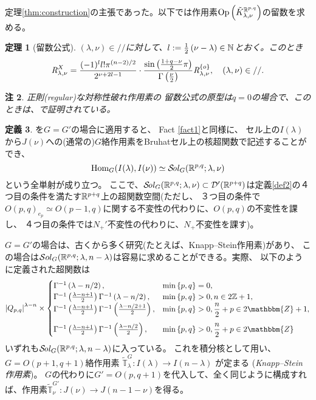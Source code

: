 \documentclass[12pt]{article} %
\newcommand{\Hom}{\mbox{\normalfont Hom}}
\newcommand{\Sol}{\mathcal{S}\!{\it ol}}
\newtheorem{theorem}{定理}
\newtheorem{remark}[theorem]{注}
\theoremstyle{definition}
\newtheorem{definition}[theorem]{定義}
\theoremstyle{exampstyle} \newtheorem{examp}[theorem]{Theorem}
\newcommand{\Op}{\mbox{\normalfont Op}}
\newcommand{\OpR}{\mbox{\it R}}
\renewcommand{\Q}{Q_{p,q}}
\newcommand{\doubt}[1]{{#1}}
\begin{document}
定理\ref{thm:construction}の主張であった。以下では作用素$\Op\left( \tilde{K}^{\R^{p,q}}_{\lambda,\nu} \right)$の留数を求める。
\begin{theorem}[留数公式]
	$(\lambda,\nu)\in//$に対して、$l:=\frac{1}{2}\left( \nu-\lambda \right)\in\mathbb{N}$とおく。このとき
  \[\OpR_{\lambda,\nu}^X  = \frac{ (- 1)^l l!\pi^{(n - 2) / 2} 
		}{2^{ \nu + 2 l-1}}\cdot  \frac{\sin\left( \frac{1+q-\nu}{2}\pi \right)}{\Gamma\left( \frac{\nu}{2} \right)}
     \OpR_{\lambda,\nu}^{ \left\{ o \right\} },\quad(\lambda,\nu)\in// . \]
	\end{theorem}
	\begin{remark}
		正則(regular)な対称性破れ作用素の
		留数公式の原型は$q=0$の場合で、このときは\cite{KOBAYASHI2014272}、\cite[Thm. 12.2]{kobayashi2015symmetry}で証明されている。
	\end{remark}
	\begin{definition}
		\cite[Thm. 3.16]{kobayashi2015symmetry}を$G=G'$の場合に適用すると\doubt{、}
		Fact \ref{fact1}と同様に、
		セル上の$I(\lambda)$から$J(\nu)$への(通常の)$G$絡作用素をBruhatセル上の核超関数で記述することができ、
		\begin{equation*}
		\Hom_G(I(\lambda),I(\nu))\simeq\Sol_G(\R^{p,q};\lambda,\nu)
		\end{equation*}
		という全単射が成り立つ。
		ここで、\;$\Sol_G(\R^{p,q};\lambda,\nu)\subset\mathcal{D}'(\R^{p+q})$は定義\ref{def2}の４つ目の条件を満たす$\mathbb{R}^{p+q}$上の超関数空間(ただし、
		３つ目の条件で$O(p,q)_{e_p}\simeq O(p-1,q)${に関する}不変性の代わりに、$O(p,q)$の不変性を課し、
		４つ目の条件では$N_+'$不変性の代わりに、$N_+$不変性を課す)。

		$G=G'$の場合は、古くから多く研究(たとえば、Knapp--Stein作用素)があり、
		この場合は$\mathcal{S}ol_G(\mathbb{R}^{p,q};\lambda,n-\lambda)$は容易に求めることができる。実際、
		以下のように定義された超関数は
		\begin{equation*}
			\myabs{\Q}^{\lambda-n}\times\begin{cases}
				\Gamma^{-1}\left( \lambda-n/2 \right),&\min\left\{ p,q \right\}=0,\\
				\Gamma^{-1}\left( \frac{\lambda-n+1}{2} \right)\Gamma^{-1}\left( \lambda-n/2 \right),&\min\left\{ p,q \right\}>0,n\in2\Z+1,\\
  \Gamma^{-1} \left( \frac{\lambda-n + 1}{2} \right) \Gamma ^{-1}\left( \frac{\lambda-n/2+
  1}{2} \right), &\min\left\{ p,q \right\}>0, \frac{n}{2} + p \in 2\mathbbm{Z}+ 1,\\[10pt]
  \Gamma^{-1} \left( \frac{\lambda-n + 1}{2} \right) \Gamma ^{-1}\left( \frac{\lambda-n/2}{2}
  \right), & \min\left\{ p,q \right\}>0,\frac{n}{2} + p \in 2\mathbbm{Z}
			\end{cases}
		\end{equation*}
		いずれも$\Sol_G(\R^{p,q};\lambda,n-\lambda)$に入っている。
		これを積分核として用い、$G=O(p+1,q+1)$絡作用素
		$\tilde{\mathbb{T}}^{G}_{\lambda}:I(\lambda)\to
		I(n-\lambda)$
		が定まる
		(\textit{Knapp--Stein 作用素})。
		$G$の代わりに$G'=O(p,q+1)$を代入して、全く同じように構成すれば、作用素$\tilde{\mathbb{T}}^{G'}_\nu:J(\nu)\to J(n-1-\nu)$を得る。
	\end{definition}
\end{document}

